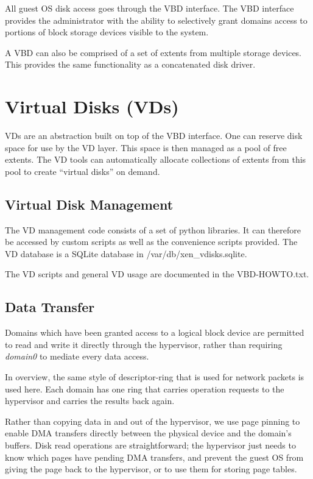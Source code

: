 \documentclass[11pt,twoside,final,openright]{xenstyle}
\begin{document}
All guest OS disk access goes through the VBD interface. The VBD interface
provides the administrator with the ability to selectively grant domains 
access to portions of block storage devices visible to the system.

A VBD can also be comprised of a set of extents from multiple storage devices.
This provides the same functionality as a concatenated disk driver.

\section{Virtual Disks (VDs)}

VDs are an abstraction built on top of the VBD interface. One can reserve disk
space for use by the VD layer. This space is then managed as a pool of free extents.
The VD tools can automatically allocate collections of extents from this pool to
create ``virtual disks'' on demand. 

\subsection{Virtual Disk Management}
The VD management code consists of a set of python libraries. It can therefore
be accessed by custom scripts as well as the convenience scripts provided. The
VD database is a SQLite database in /var/db/xen\_vdisks.sqlite.

The VD scripts and general VD usage are documented in the VBD-HOWTO.txt.

\subsection{Data Transfer}
Domains which have been granted access to a logical block device are permitted
to read and write it directly through the hypervisor, rather than requiring
{\it domain0} to mediate every data access. 

In overview, the same style of descriptor-ring that is used for network
packets is used here. Each domain has one ring that carries operation requests to the 
hypervisor and carries the results back again. 

Rather than copying data in and out of the hypervisor, we use page pinning to
enable DMA transfers directly between the physical device and the domain's 
buffers. Disk read operations are straightforward; the hypervisor just needs
to know which pages have pending DMA transfers, and prevent the guest OS from
giving the page back to the hypervisor, or to use them for storing page tables.
\end{document}
